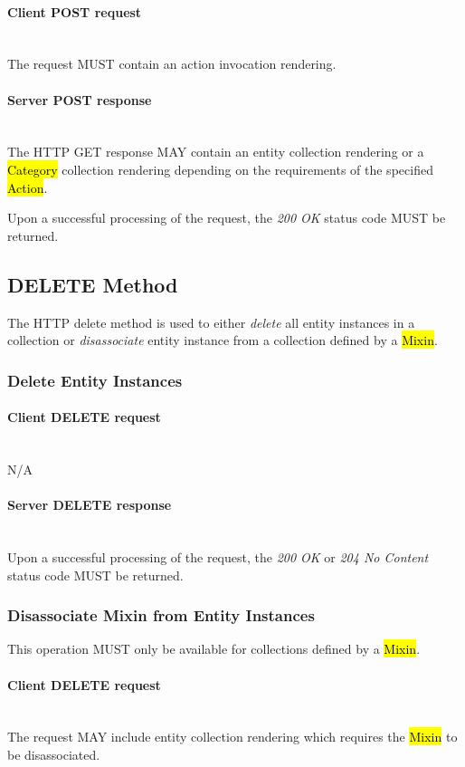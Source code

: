 \documentclass[10pt,a4paper]{article}
\begin{document}
\paragraph*{Client POST request}\hfill\\
The request MUST contain an action invocation rendering.

\paragraph*{Server POST response}\hfill\\
The HTTP GET response MAY contain an entity collection rendering or a \hl{Category} collection rendering
depending on the requirements of the specified \hl{Action}.

Upon a successful processing of the request, the \emph{200 OK} status code MUST be returned.

\subsection{DELETE Method}
The HTTP delete method is used to either {\em delete} all entity instances in
a collection or {\em disassociate} entity instance from a collection defined
by a \hl{Mixin}.

\subsubsection{Delete Entity Instances}

\paragraph*{Client DELETE request}\hfill\\
N/A

\paragraph*{Server DELETE response}\hfill\\
Upon a successful processing of the request, the \emph{200 OK} or \emph{204 No Content} status code MUST be returned.

\subsubsection{Disassociate Mixin from Entity Instances}
This operation MUST only be available for collections defined by a \hl{Mixin}.

\paragraph*{Client DELETE request}\hfill\\
The request MAY include entity collection rendering which requires the \hl{Mixin} to be disassociated.
\end{document}
